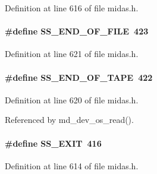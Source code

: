 \begin{DoxyItemize}
\item 
\end{DoxyItemize}

Definition at line 616 of file midas.h.
\paragraph[{SS\_\-END\_\-OF\_\-FILE}]{\setlength{\rightskip}{0pt plus 5cm}\#define SS\_\-END\_\-OF\_\-FILE~423}\hfill\label{group__err24_ga040a5d277934aea616a26f523711a803}

\begin{DoxyItemize}
\item 
\end{DoxyItemize}

Definition at line 621 of file midas.h.
\paragraph[{SS\_\-END\_\-OF\_\-TAPE}]{\setlength{\rightskip}{0pt plus 5cm}\#define SS\_\-END\_\-OF\_\-TAPE~422}\hfill\label{group__err24_ga91cc51ebf0822e08c4935a2c09a1a60c}

\begin{DoxyItemize}
\item 
\end{DoxyItemize}

Definition at line 620 of file midas.h.

Referenced by md\_\-dev\_\-os\_\-read().
\paragraph[{SS\_\-EXIT}]{\setlength{\rightskip}{0pt plus 5cm}\#define SS\_\-EXIT~416}\hfill\label{group__err24_ga8bdfd6ab89f9628d57174f8a4287bf9f}

\begin{DoxyItemize}
\item 
\end{DoxyItemize}

Definition at line 614 of file midas.h.
